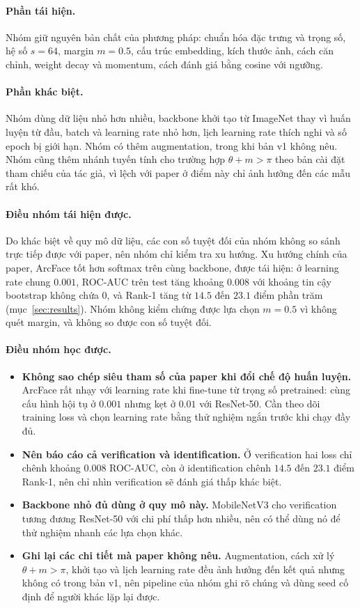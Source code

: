 \documentclass[a4paper,12pt]{article}
\begin{document}
\paragraph{Phần tái hiện.} Nhóm giữ nguyên bản chất của phương pháp: chuẩn hóa đặc trưng và trọng số, hệ số $s = 64$, margin $m = 0.5$, cấu trúc embedding, kích thước ảnh, cách căn chỉnh, weight decay và momentum, cách đánh giá bằng cosine với ngưỡng.

\paragraph{Phần khác biệt.} Nhóm dùng dữ liệu nhỏ hơn nhiều, backbone khởi tạo từ ImageNet thay vì huấn luyện từ đầu, batch và learning rate nhỏ hơn, lịch learning rate thích nghi và số epoch bị giới hạn. Nhóm có thêm augmentation, trong khi bản v1 không nêu. Nhóm cũng thêm nhánh tuyến tính cho trường hợp $\theta + m > \pi$ theo bản cài đặt tham chiếu của tác giả, vì lệch với paper ở điểm này chỉ ảnh hưởng đến các mẫu rất khó.

\paragraph{Điều nhóm tái hiện được.} Do khác biệt về quy mô dữ liệu, các con số tuyệt đối của nhóm không so sánh trực tiếp được với paper, nên nhóm chỉ kiểm tra xu hướng. Xu hướng chính của paper, ArcFace tốt hơn softmax trên cùng backbone, được tái hiện: ở learning rate chung $0.001$, ROC-AUC trên test tăng khoảng $0.008$ với khoảng tin cậy bootstrap không chứa $0$, và Rank-1 tăng từ $14.5$ đến $23.1$ điểm phần trăm (mục~\ref{sec:results}). Nhóm không kiểm chứng được lựa chọn $m = 0.5$ vì không quét margin, và không so được con số tuyệt đối.

\paragraph{Điều nhóm học được.}
\begin{itemize}
    \item \textbf{Không sao chép siêu tham số của paper khi đổi chế độ huấn luyện.} ArcFace rất nhạy với learning rate khi fine-tune từ trọng số pretrained: cùng cấu hình hội tụ ở $0.001$ nhưng kẹt ở $0.01$ với ResNet-50. Cần theo dõi training loss và chọn learning rate bằng thử nghiệm ngắn trước khi chạy đầy đủ.
    \item \textbf{Nên báo cáo cả verification và identification.} Ở verification hai loss chỉ chênh khoảng $0.008$ ROC-AUC, còn ở identification chênh $14.5$ đến $23.1$ điểm Rank-1, nên chỉ nhìn verification sẽ đánh giá thấp khác biệt.
    \item \textbf{Backbone nhỏ đủ dùng ở quy mô này.} MobileNetV3 cho verification tương đương ResNet-50 với chi phí thấp hơn nhiều, nên có thể dùng nó để thử nghiệm nhanh các lựa chọn khác.
    \item \textbf{Ghi lại các chi tiết mà paper không nêu.} Augmentation, cách xử lý $\theta + m > \pi$, khởi tạo và lịch learning rate đều ảnh hưởng đến kết quả nhưng không có trong bản v1, nên pipeline của nhóm ghi rõ chúng và dùng seed cố định để người khác lặp lại được.
\end{itemize}
\end{document}
